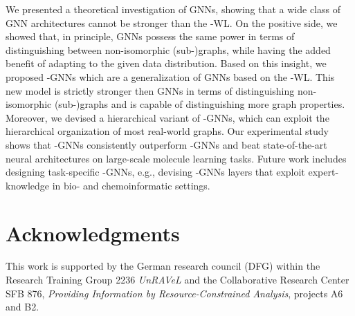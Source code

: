 \documentclass[letterpaper]{article}
\theoremstyle{definition}
\begin{document}
We presented a theoretical investigation of GNNs, showing that a wide class of GNN architectures cannot be stronger than the -WL. On the positive side, we showed that, in principle, GNNs possess the same power in terms of distinguishing between non-isomorphic (sub-)graphs, while having the added benefit of adapting to the given data distribution. Based on this insight, we proposed -GNNs which are a generalization of GNNs based on the -WL. This new model is strictly stronger then GNNs in terms of distinguishing non-isomorphic (sub-)graphs and is capable of distinguishing more graph properties. Moreover, we devised a hierarchical variant of -GNNs, which can exploit the hierarchical organization of most real-world graphs. Our experimental study shows that -GNNs consistently outperform -GNNs and beat state-of-the-art neural architectures on large-scale molecule learning tasks. Future work includes designing task-specific -GNNs, e.g., devising -GNNs layers that exploit expert-knowledge in bio- and chemoinformatic settings. 

\section*{Acknowledgments}
This work is supported by the German research council (DFG) within the Research Training Group 2236 \emph{UnRAVeL} and the Collaborative Research Center
SFB 876, \emph{Providing Information by Resource-Constrained
Analysis}, projects A6 and B2.
\end{document}
